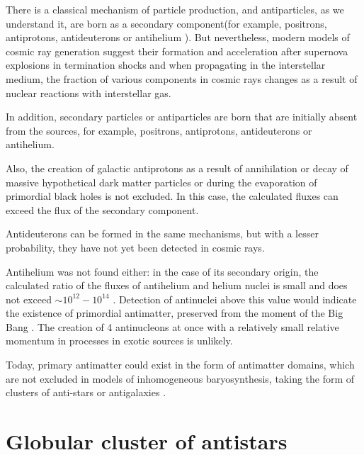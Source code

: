 \documentclass{article}
\begin{document}
There is a classical mechanism of particle production, and antiparticles, as we understand it, are born as a secondary component(for example, positrons, antiprotons, antideuterons or antihelium \cite{Moskalenko}). But nevertheless, modern models of cosmic ray generation suggest their formation and acceleration after supernova explosions in termination shocks\cite{Oliva} and when propagating in the interstellar medium, the fraction of various components in cosmic rays changes as a result of nuclear reactions with interstellar gas\cite{Moskalenko}.






 In addition, secondary particles or antiparticles are born that are initially absent from the sources, for example, positrons, antiprotons, antideuterons or antihelium.

Also, the creation of galactic antiprotons as a result of annihilation or decay of massive hypothetical dark matter particles or during the evaporation of primordial black holes is not excluded\cite{darkmatter}. In this case, the calculated fluxes can exceed the flux of the secondary component.

Antideuterons can be formed in the same mechanisms, but with a lesser probability, they have not yet been detected in cosmic rays\cite{Moskalenko}.


Antihelium was not found either: in the case of its secondary origin, the calculated ratio of the fluxes of antihelium and helium nuclei is small and does not exceed $\sim 10^{12} - 10^{14}$ \cite{Moskalenko}. Detection of antinuclei above this value would indicate the existence of primordial antimatter, preserved from the moment of the Big Bang  \cite{newBook,DolgovAM}. The creation of 4 antinucleons at once with a relatively small relative momentum in processes in exotic sources is unlikely.

Today, primary antimatter could exist in the form of antimatter domains, which are not excluded in models of inhomogeneous baryosynthesis, taking the form of clusters of anti-stars or antigalaxies \cite{Khlopov}.
\section{Globular cluster of antistars}
\end{document}
